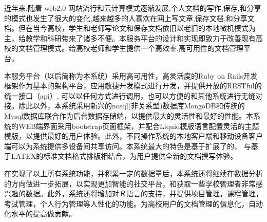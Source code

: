 
\begin{cabstract}
近年来,随着 web2.0 网站流行和云计算模式逐渐发展,个人文档的写作,保存,和分享的模式也发生了很大的变化,越来越多的人喜欢在网上写文章,保存文档,和分享文档。但在当今高校，学生和老师写论文和保存文档依旧以老旧的本地微机模式为主，给教学和科研带来了诸多不便。本服务平台的设计和实现即致力于改善现有高校的文档管理模式。给高校老师和学生提供一个高效率,高可用性的文档管理平台。

本服务平台（以后简称为本系统）采用高可用性，高灵活度的Ruby on Rails开发框架作为基本的架构平台，应用敏捷开发模式进行开发，并提供开放的RESTful的统一接口（api）, 可以以任何方式进行调用，也可以方便的和其他系统进行无缝对接。除此以外，本系统采用新兴的nosql(非关系型)数据库MongoDB和传统的Mysql数据库联合作为后台数据存储端，以提供最大的灵活性和最好的性能。本系统的WEB端界面采用bootstrap页面框架，并配合Liquid模版语言配置灵活的主题模版，以提供最好的用户体验。此外，不同操作系统的本地客户端和移动设备客户端可以为系统提供多设备间共享访问。本系统最大的特色是基于扩展了的， 与基于LATEX的标准文档格式排版相结合，为用户提供全新的文档撰写体验。

在实现了以上所有系统功能，并积累一定的数据量后，本系统还将继续在数据分析的方向做进一步拓展，以实现更加智能的社交平台，和获取一些学校管理者非常感兴趣的数据。此外，系统还将增加对Ｒ语言的支持，并提供项目管理，课程管理，考试管理，个人行为管理等人性化的功能。为高校用户的文档管理的信息化，自动化水平的提高做贡献。
\end{cabstract}


